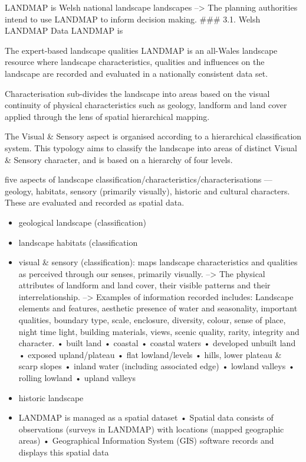 \documentclass[]{elsarticle} %
\providecommand{\tightlist}{%
  \setlength{\itemsep}{0pt}\setlength{\parskip}{0pt}}
\begin{document}
LANDMAP is Welsh national landscape landscapes --\textgreater{} The
planning authorities intend to use LANDMAP to inform decision making.
\#\#\# 3.1. Welsh LANDMAP Data LANDMAP is

The expert-based landscape qualities LANDMAP is an all-Wales landscape
resource where landscape characteristics, qualities and influences on
the landscape are recorded and evaluated in a nationally consistent data
set.

Characterisation sub-divides the landscape into areas based on the
visual continuity of physical characteristics such as geology, landform
and land cover applied through the lens of spatial hierarchical mapping.

The Visual \& Sensory aspect is organised according to a hierarchical
classification system. This typology aims to classify the landscape into
areas of distinct Visual \& Sensory character, and is based on a
hierarchy of four levels.

five aspects of landscape
classification/characteristics/characterisations --- geology, habitats,
sensory (primarily visually), historic and cultural characters. These
are evaluated and recorded as spatial data.

\begin{itemize}
\tightlist
\item
  geological landscape (classification)
\item
  landscape habitats (classification
\item
  visual \& sensory (classification): maps landscape characteristics and
  qualities as perceived through our senses, primarily visually.
  --\textgreater{} The physical attributes of landform and land cover,
  their visible patterns and their interrelationship. --\textgreater{}
  Examples of information recorded includes: Landscape elements and
  features, aesthetic presence of water and seasonality, important
  qualities, boundary type, scale, enclosure, diversity, colour, sense
  of place, night time light, building materials, views, scenic quality,
  rarity, integrity and character. • built land • coastal • coastal
  waters • developed unbuilt land • exposed upland/plateau • flat
  lowland/levels • hills, lower plateau \& scarp slopes • inland water
  (including associated edge) • lowland valleys • rolling lowland •
  upland valleys
\item
  historic landscape
\item
  LANDMAP is managed as a spatial dataset • Spatial data consists of
  observations (surveys in LANDMAP) with locations (mapped geographic
  areas) • Geographical Information System (GIS) software records and
  displays this spatial data
\end{itemize}
\end{document}
